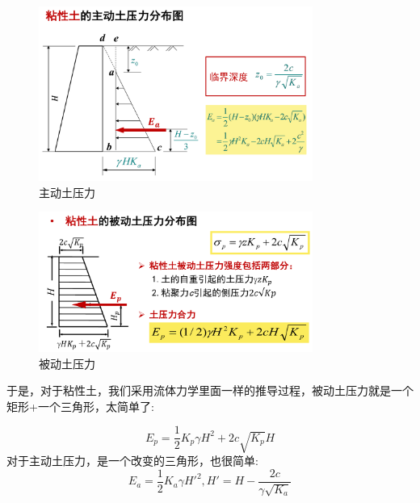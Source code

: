 \documentclass[12pt, a4paper, oneside, UTF8]{ctexbook}
\begin{document}
\begin{example}
\begin{figure}[H]
    \centering
    \includegraphics[width=0.8\textwidth]{../figure/zhudong.png}
    \caption{主动土压力}
\end{figure}

\begin{figure}[H]
    \centering
    \includegraphics[width=0.8\textwidth]{../figure/beidong.png}
    \caption{被动土压力}
\end{figure}

于是，对于粘性土，我们采用流体力学里面一样的推导过程，被动土压力就是一个矩形+一个三角形，太简单了:

$$
E_p = \frac{1}{2} K_p \gamma H^2 + 2c \sqrt{K_p} H
$$
对于主动土压力，是一个改变的三角形，也很简单:
$$
E_a = \frac{1}{2} K_a \gamma H'^2,H' = H - \frac{2c}{\gamma \sqrt{K_a}}
$$

\end{example}
\end{document}
